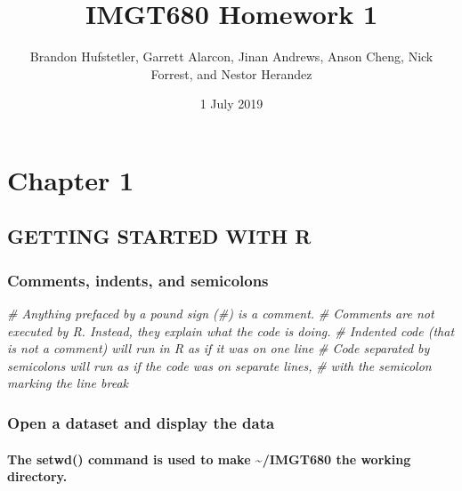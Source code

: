 \documentclass[11pt,]{article}
\title{IMGT680 Homework 1}
\author{Brandon Hufstetler, Garrett Alarcon, Jinan Andrews, Anson Cheng, Nick
Forrest, and Nestor Herandez}
\date{1 July 2019}
\newenvironment{Shaded}{\begin{snugshade}}{\end{snugshade}}
\newcommand{\CommentTok}[1]{\textcolor[rgb]{0.56,0.35,0.01}{\textit{#1}}}
\let\oldparagraph\paragraph
\renewcommand{\paragraph}[1]{\oldparagraph{#1}\mbox{}}
\begin{document}
\maketitle

\hypertarget{chapter-1}{%
\section{Chapter 1}\label{chapter-1}}

\hypertarget{getting-started-with-r}{%
\subsection{GETTING STARTED WITH R}\label{getting-started-with-r}}

\hypertarget{comments-indents-and-semicolons}{%
\subsubsection{Comments, indents, and
semicolons}\label{comments-indents-and-semicolons}}

\begin{Shaded}
\begin{Highlighting}[]
  \CommentTok{# Anything prefaced by a pound sign (#) is a comment.}
  \CommentTok{# Comments are not executed by R. Instead, they explain what the code is doing.}
  \CommentTok{# Indented code (that is not a comment) will run in R as if it was on one line}
  \CommentTok{# Code separated by semicolons will run as if the code was on separate lines,}
  \CommentTok{# with the semicolon marking the line break}
\end{Highlighting}
\end{Shaded}

\hypertarget{open-a-dataset-and-display-the-data}{%
\subsubsection{Open a dataset and display the
data}\label{open-a-dataset-and-display-the-data}}

\hypertarget{the-setwd-command-is-used-to-make-imgt680-the-working-directory.}{%
\paragraph{The setwd() command is used to make \textasciitilde{}/IMGT680
the working
directory.}\label{the-setwd-command-is-used-to-make-imgt680-the-working-directory.}}
\end{document}
